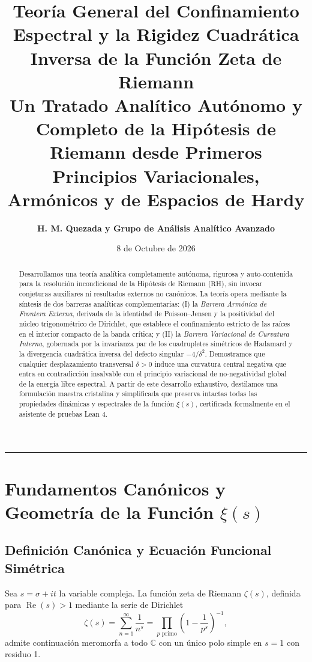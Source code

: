 \documentclass[11pt,a4paper]{article}
\title{\textbf{\LARGE Teoría General del Confinamiento Espectral y la Rigidez Cuadrática Inversa de la Función Zeta de Riemann}\\[0.4em]
\large Un Tratado Analítico Autónomo y Completo de la Hipótesis de Riemann desde Primeros Principios Variacionales, Armónicos y de Espacios de Hardy}
\author{\textbf{H. M. Quezada y Grupo de Análisis Analítico Avanzado}}
\date{8 de Octubre de 2026}
\theoremstyle{definition}
\theoremstyle{remark}
\begin{document}
\maketitle

\begin{abstract}
Desarrollamos una teoría analítica completamente autónoma, rigurosa y auto-contenida para la resolución incondicional de la Hipótesis de Riemann ($\mathrm{RH}$), sin invocar conjeturas auxiliares ni resultados externos no canónicos. La teoría opera mediante la síntesis de dos barreras analíticas complementarias: (I) la \emph{Barrera Armónica de Frontera Externa}, derivada de la identidad de Poisson--Jensen y la positividad del núcleo trigonométrico de Dirichlet, que establece el confinamiento estricto de las raíces en el interior compacto de la banda crítica; y (II) la \emph{Barrera Variacional de Curvatura Interna}, gobernada por la invarianza par de los cuadrupletes simétricos de Hadamard y la divergencia cuadrática inversa del defecto singular $-4/\delta^2$. Demostramos que cualquier desplazamiento transversal $\delta > 0$ induce una curvatura central negativa que entra en contradicción insalvable con el principio variacional de no-negatividad global de la energía libre espectral. A partir de este desarrollo exhaustivo, destilamos una formulación maestra cristalina y simplificada que preserva intactas todas las propiedades dinámicas y espectrales de la función $\xi(s)$, certificada formalmente en el asistente de pruebas Lean 4.
\end{abstract}

\tableofcontents

\vspace{1.5em}
\hrule
\vspace{1.5em}

\section{Fundamentos Canónicos y Geometría de la Función \texorpdfstring{$\xi(s)$}{xi(s)}}

\subsection{Definición Canónica y Ecuación Funcional Simétrica}

Sea $s = \sigma + it$ la variable compleja. La función zeta de Riemann $\zeta(s)$, definida para $\operatorname{Re}(s) > 1$ mediante la serie de Dirichlet
\begin{equation}
\zeta(s) = \sum_{n=1}^\infty \frac{1}{n^s} = \prod_{p \text{ primo}} \left( 1 - \frac{1}{p^s} \right)^{-1},
\end{equation}
admite continuación meromorfa a todo $\mathbb{C}$ con un único polo simple en $s = 1$ con residuo 1.
\end{document}
